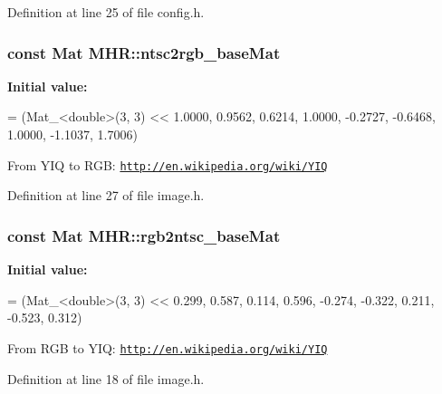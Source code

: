 Definition at line 25 of file config.\+h.

\hypertarget{namespace_m_h_r_a1ab4a7e6b45362de2827fd373b53ba24}{
\subsubsection[{ntsc2rgb\+\_\+base\+Mat}]{\setlength{\rightskip}{0pt plus 5cm}const Mat M\+H\+R\+::ntsc2rgb\+\_\+base\+Mat}}\label{namespace_m_h_r_a1ab4a7e6b45362de2827fd373b53ba24}
{\bfseries Initial value\+:}
\begin{DoxyCode}
= (Mat\_<double>(3, 3) <<
                                  1.0000, 0.9562, 0.6214,
                                  1.0000, -0.2727, -0.6468,
                                  1.0000, -1.1037, 1.7006)
\end{DoxyCode}
From Y\+I\+Q to R\+G\+B\+:  \href{http://en.wikipedia.org/wiki/YIQ}{\tt http\+://en.\+wikipedia.\+org/wiki/\+Y\+I\+Q} 

Definition at line 27 of file image.\+h.

\hypertarget{namespace_m_h_r_a7191e886f0a618347db01d5743eb2856}{
\subsubsection[{rgb2ntsc\+\_\+base\+Mat}]{\setlength{\rightskip}{0pt plus 5cm}const Mat M\+H\+R\+::rgb2ntsc\+\_\+base\+Mat}}\label{namespace_m_h_r_a7191e886f0a618347db01d5743eb2856}
{\bfseries Initial value\+:}
\begin{DoxyCode}
= (Mat\_<double>(3, 3) <<
                                  0.299, 0.587, 0.114,
                                  0.596, -0.274, -0.322,
                                  0.211, -0.523, 0.312)
\end{DoxyCode}
From R\+G\+B to Y\+I\+Q\+:  \href{http://en.wikipedia.org/wiki/YIQ}{\tt http\+://en.\+wikipedia.\+org/wiki/\+Y\+I\+Q} 

Definition at line 18 of file image.\+h.


